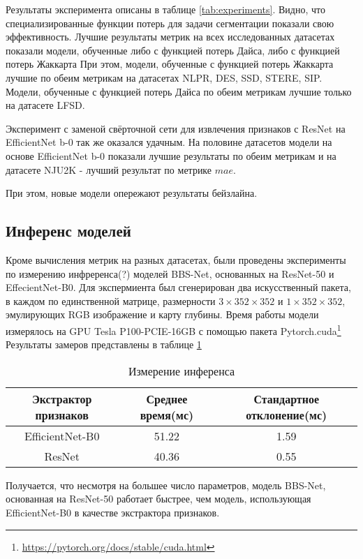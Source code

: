 Результаты эксперимента описаны в таблице \ref{tab:experiments}. 
Видно, что специализированные функции потерь для задачи сегментации
показали свою эффективность. Лучшие результаты метрик на всех исследованных
датасетах показали модели, обученные либо с функцией потерь Дайса, либо с функцией потерь Жаккарта
При этом, модели, обученные с функцией потерь Жаккарта лучшие по обеим метрикам
на датасетах NLPR, DES, SSD, STERE, SIP. Модели, обученные с функцией потерь Дайса 
по обеим метрикам лучшие только на датасете LFSD.

Эксперимент с заменой свёрточной сети для извлечения признаков с ResNet на EfficientNet b-0 
так же оказался удачным. На половине датасетов модели на основе EfficientNet b-0 показали 
лучшие результаты по обеим метрикам и на датасете NJU2K - лучший результат по метрике $mae$.

При этом, новые модели опережают результаты бейзлайна.


\subsection{Инференс моделей}

Кроме вычисления метрик на разных датасетах, были проведены эксперименты по измерению
инфреренса(?) моделей BBS-Net, основанных на ResNet-50 и EffecientNet-B0. 
Для экспермиента был сгенерирован два искусственный пакета, в каждом по единственной матрице, размерности 
$3 \times 352 \times 352$ и $1 \times 352 \times 352$, эмулирующих RGB изображение и карту глубины.
Время работы модели измерялось на GPU Tesla P100-PCIE-16GB с помощью пакета Pytorch.cuda\footnote{\url{https://pytorch.org/docs/stable/cuda.html}}
Результаты замеров представлены в таблице \ref{tab:inference}

\begin{center}
    \begin{table}
        \begin{tabular}{ |c|c|c| } 
            \hline
            Экстрактор признаков & Среднее время(мс) & Стандартное отклонение(мс) \\
            \hline
            EfficientNet-B0&51.22&1.59\\
            \hline
            ResNet&40.36&0.55 \\
            \hline
        \end{tabular}
        \caption{Измерение инференса}
        \label{tab:inference}
        \end{table}
    \end{center}

Получается, что несмотря на большее число параметров, модель BBS-Net, основанная на ResNet-50 работает быстрее, чем модель, использующая EfficientNet-B0 в качестве 
экстрактора признаков.  